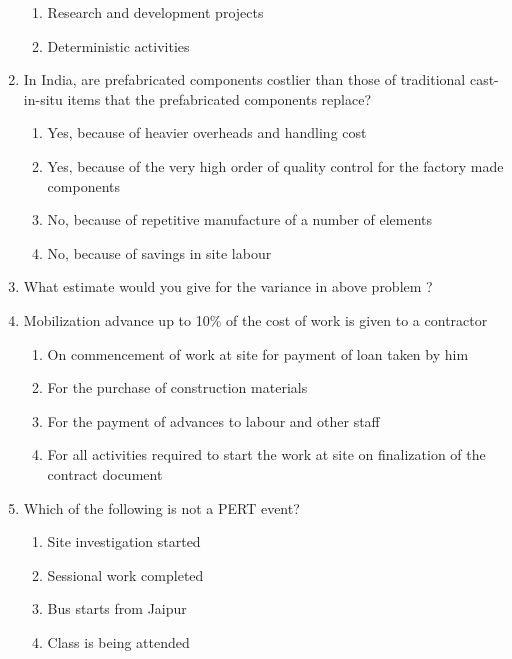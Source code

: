 \documentclass[11pt,a4paper]{article}
\begin{document}
\begin{enumerate}
\begin{enumerate}[label=\Alph*.]
\item{Research and development projects}
\item{Deterministic activities}
\end{enumerate}
\item{In India, are prefabricated components costlier than those of traditional cast-in-situ items that the prefabricated components replace?}
\begin{enumerate}[label=\Alph*.]
\item{Yes, because of heavier overheads and handling cost}
\item{Yes, because of the very high order of quality control for the factory made components}
\item{No, because of repetitive manufacture of a number of elements}
\item{No, because of savings in site labour}
\end{enumerate}
\item{What estimate would you give for the variance in above problem ?}
\\
\item{Mobilization advance up to 10\% of the cost of work is given to a contractor}
\begin{enumerate}[label=\Alph*.]
\item{On commencement of work at site for payment of loan taken by him}
\item{For the purchase of construction materials}
\item{For the payment of advances to labour and other staff}
\item{For all activities required to start the work at site on finalization of the contract document}
\end{enumerate}
\item{Which of the following is not a PERT event?}
\begin{enumerate}[label=\Alph*.]
\item{Site investigation started}
\item{Sessional work completed}
\item{Bus starts from Jaipur}
\item{Class is being attended}
\end{enumerate}

\end{enumerate}
\end{document}

